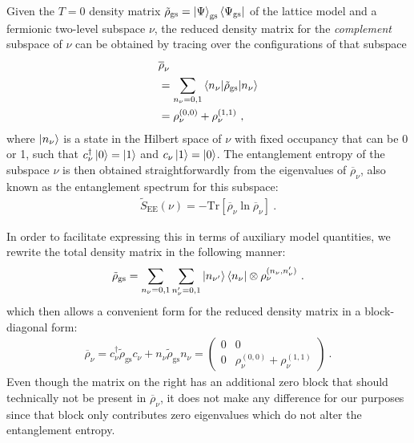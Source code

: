 \documentclass[reprint,hidelinks]{revtex4-2}
\begin{document}
Given the \(T=0\) density matrix \(\tilde\rho_\text{gs} = \ket{\Psi}_\text{gs}\bra{{\Psi}_\text{gs}}\) of the lattice model and a fermionic two-level subspace \(\nu\), the reduced density matrix for the {\it complement} subspace of \(\nu\) can be obtained by tracing over the configurations of that subspace
\begin{equation}\begin{aligned}
	&\overline\rho_{\nu} \\
	&= \sum_{n_{\nu}=0,1}\braket{n_{\nu}|\tilde\rho_\text{gs}|n_{\nu}}\\
	&= \rho_{\nu}^{(0,0)} + \rho_{\nu}^{(1,1)}~,
\end{aligned}\end{equation}
where \(\ket{n_{\nu}}\) is a state in the Hilbert space of \(\nu\) with fixed occupancy that can be 0 or 1, such that \(c^\dagger_\nu\ket{0}=\ket{1}\) and \(c_\nu\ket{1}=\ket{0}\). The entanglement entropy of the subspace \(\nu\) is then obtained straightforwardly from the eigenvalues of \(\overline\rho_{\nu}\), also known as the entanglement spectrum for this subspace:
\begin{equation}\begin{aligned}
	\tilde S_\text{EE}(\nu) = -\text{Tr}\left[\overline\rho_{\nu}\ln \overline\rho_{\nu}\right]  ~.
\end{aligned}\end{equation}

In order to facilitate expressing this in terms of auxiliary model quantities, we rewrite the total density matrix in the following manner:
\begin{equation}\begin{aligned}
	\tilde\rho_\text{gs} = \sum_{n_\nu=0,1}\sum_{n_\nu^\prime=0,1}\ket{n_{\nu^\prime}}\bra{n_{\nu}}\otimes\rho_\nu^{(n_\nu, n_\nu^\prime)}~.
\end{aligned}\end{equation}
which then allows a convenient form for the reduced density matrix in a block-diagonal form:
\begin{equation}\begin{aligned}
	\overline\rho_{\nu} = c^\dagger_\nu \tilde\rho_\text{gs} c_\nu + n_\nu \tilde\rho_\text{gs} n_\nu = \begin{pmatrix} 0 & 0 \\ 0 & \rho_{\nu}^{(0,0)} + \rho_{\nu}^{(1,1)} \end{pmatrix} ~.
\end{aligned}\end{equation}
Even though the matrix on the right has an additional zero block that should technically not be present in \(\overline\rho_{\nu}\), it does not make any difference for our purposes since that block only contributes zero eigenvalues which do not alter the entanglement entropy. 
\end{document}

